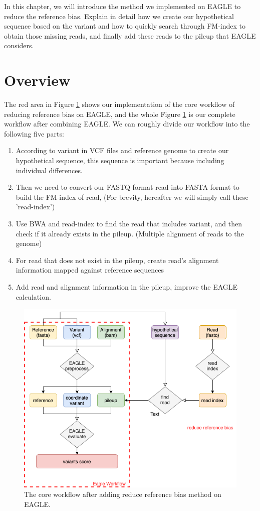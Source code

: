 \hspace{24pt}
In this chapter, we will introduce the method we implemented on EAGLE to reduce the reference bias. Explain in detail how we create our hypothetical sequence based on the variant and how to quickly search through FM-index to obtain those missing reads, and finally add these reads to the pileup that EAGLE considers.
\section{Overview}
The red area in Figure \ref{f3-1} shows our implementation of the core workflow of reducing reference bias on EAGLE, and the whole  Figure \ref{f3-1} is our complete workflow after combining EAGLE. 
We can roughly divide our workflow into the following five parts:
\begin{enumerate}
    \item According to variant in VCF files and reference genome to create our hypothetical sequence, this sequence is important because including individual differences.
    \item Then we need to convert our FASTQ format read into FASTA format to build the FM-index of read, (For brevity, hereafter we will simply call these 'read-index')
    \item Use BWA and read-index to find the read that includes variant, and then check if it already exists in the pileup. (Multiple alignment of reads to the genome)
    \item For read that does not exist in the pileup, create read's alignment information mapped against reference sequences 
    \item Add read and alignment information in the pileup, improve the EAGLE calculation.

\end{enumerate}

\begin{figure}[H]
    \centering
    \includegraphics[width=0.8\columnwidth]{body/image/3-1.png}
    \captionsetup{labelfont=bf}
    \renewcommand{\baselinestretch}{1.0}
    \caption[Core workflow]{The core workflow after adding reduce reference bias method on EAGLE.}
    \label{f3-1}
\end{figure}

